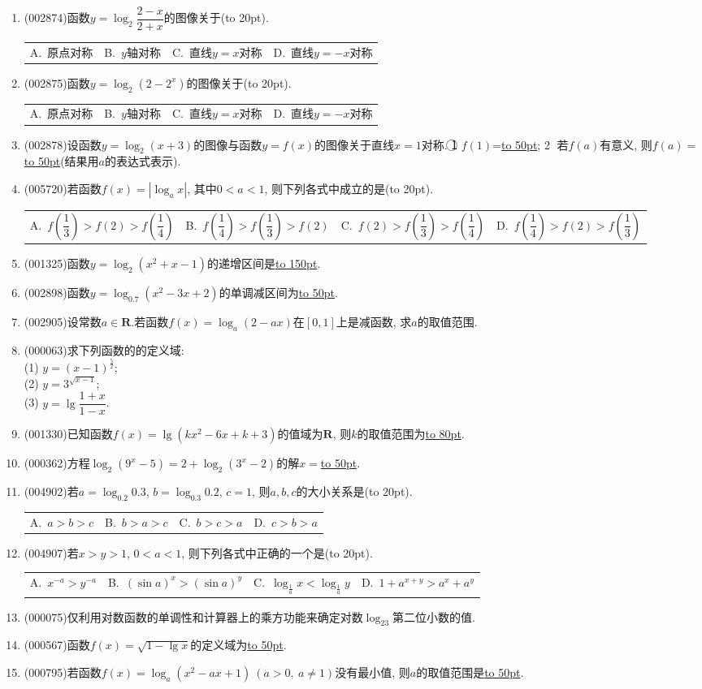 \documentclass[10pt,a4paper]{article}
\newcommand{\blank}[1]{\underline{\hbox to #1pt{}}}
\newcommand{\bracket}[1]{(\hbox to #1pt{})}
\newcommand{\fourch}[4]{\par\begin{tabular}{p{.23\textwidth}p{.23\textwidth}p{.23\textwidth}p{.23\textwidth}}
A.~#1 &B.~#2& C.~#3& D.~#4
\end{tabular}}
\begin{document}
\begin{enumerate}[1.]
\item {\tiny (002874)}函数$y=\log_2\dfrac{2-x}{2+x}$的图像关于\bracket{20}.
\fourch{原点对称}{$y$轴对称}{直线$y=x$对称}{直线$y=-x$对称}
\item {\tiny (002875)}函数$y=\log_2(2-2^x)$的图像关于\bracket{20}.
\fourch{原点对称}{$y$轴对称}{直线$y=x$对称}{直线$y=-x$对称}
\item {\tiny (002878)}设函数$y=\log_2(x+3)$的图像与函数$y=f(x)$的图像关于直线$x=1$对称. \textcircled{1} $f(1)$=\blank{50}; \textcircled{2} 若$f(a)$有意义, 则$f(a)=$\blank{50}(结果用$a$的表达式表示).
\item {\tiny (005720)}若函数$f(x)=|\log_ax|$, 其中$0<a<1$, 则下列各式中成立的是\bracket{20}.
\fourch{$f(\dfrac 13)>f(2)>f(\dfrac 14)$}{$f(\dfrac 14)>f(\dfrac 13)>f(2)$}{$f(2)>f(\dfrac 13)>f(\dfrac 14)$}{$f(\dfrac 14)>f(2)>f(\dfrac 13)$}
\item {\tiny (001325)}函数$y=\log_2(x^2+x-1)$的递增区间是\blank{150}.
\item {\tiny (002898)}函数$y=\log_{0.7}(x^2-3x+2)$的单调减区间为\blank{50}.
\item {\tiny (002905)}设常数$a\in \mathbf{R}$.若函数$f(x)=\log_a(2-ax)$在$[0,1]$上是减函数, 求$a$的取值范围.
\item {\tiny (000063)}求下列函数的的定义域:\\
(1) $y=(x-1)^{\frac 52}$;\\
(2) $y=3^{\sqrt{x-1}}$;\\
(3) $y=\lg \dfrac{1+x}{1-x}$.
\item {\tiny (001330)}已知函数$f(x)=\lg(kx^2-6x+k+3)$的值域为$\mathbf{R}$, 则$k$的取值范围为\blank{80}.
\item {\tiny (000362)}方程$\log_2(9^x-5)=2+\log_2(3^x-2)$的解$x=$\blank{50}.
\item {\tiny (004902)}若$a=\log_{0.2}0.3$, $b=\log_{0.3}0.2$, $c=1$, 则$a,b,c$的大小关系是\bracket{20}.
\fourch{$a>b>c$}{$b>a>c$}{$b>c>a$}{$c>b>a$}
\item {\tiny (004907)}若$x>y>1$, $0<a<1$, 则下列各式中正确的一个是\bracket{20}.
\fourch{${x^{-a}}>{y^{-a}}$}{$(\sin a)^x>(\sin a)^y$}{$\log_{\frac 1a}x<\log_{\frac 1a}y$}{$1+a^{x+y}>a^x+a^y$}
\item {\tiny (000075)}仅利用对数函数的单调性和计算器上的乘方功能来确定对数$\log_23$第二位小数的值.
\item {\tiny (000567)}函数$f(x)=\sqrt{1-\lg x}$的定义域为\blank{50}.
\item {\tiny (000795)}若函数$f(x)={\log_a}(x^2-ax+1)\ (a>0, \ a\ne 1)$没有最小值, 则$a$的取值范围是\blank{50}.

\end{enumerate}
\end{document}
